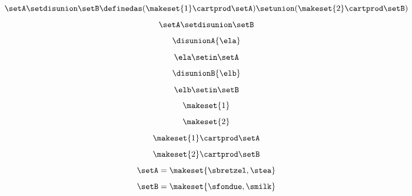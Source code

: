 {\begin{forslides}
        \begin{equation}
            \label{eq:slides_session2_59}
            \setA \setdisunion \setB \definedas (  \makeset{ 1 } \cartprod \setA) \setunion ( \makeset{2}  \cartprod \setB)
        \end{equation}
        \begin{equation}
            \label{eq:slides_session2_60}
            \setA \setdisunion \setB
        \end{equation}
        \begin{equation}
            \label{eq:slides_session2_61}
            \disunionA{\ela}
        \end{equation}
        \begin{equation}
            \label{eq:slides_session2_62}
            \ela \setin\setA
        \end{equation}
        \begin{equation}
            \label{eq:slides_session2_63}
            \disunionB{\elb}
        \end{equation}
        \begin{equation}
            \label{eq:slides_session2_64}
            \elb \setin\setB
        \end{equation}
        \begin{equation}
            \label{eq:slides_session2_65}
            \makeset{ 1 }
        \end{equation}
        \begin{equation}
            \label{eq:slides_session2_66}
            \makeset{2}
        \end{equation}
        \begin{equation}
            \label{eq:slides_session2_67}
            \makeset{ 1 }  \cartprod \setA
        \end{equation}
        \begin{equation}
            \label{eq:slides_session2_68}
            \makeset{2}  \cartprod \setB
        \end{equation}
        \begin{equation}
            \label{eq:slides_session2_69}
            \setA=\makeset{\sbretzel, \stea}
        \end{equation}
        \begin{equation}
            \label{eq:slides_session2_70}
            \setB=\makeset{\sfondue, \smilk}
        \end{equation}
        \begin{equation}

\end{equation}
\end{forslides}}
